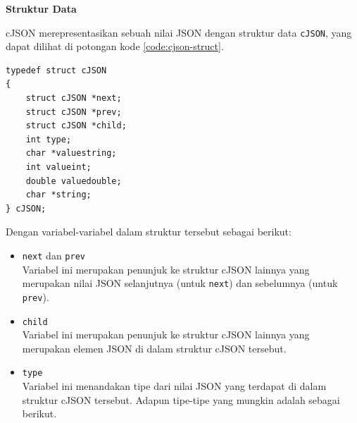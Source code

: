 \documentclass[a4paper,twoside]{article}
\begin{document}
\begin{enumerate}
\textbf{Struktur Data}
\label{sec:cmodules-cJSON-datastruct}

cJSON merepresentasikan sebuah nilai JSON dengan struktur data \verb|cJSON|, yang dapat dilihat di potongan kode \ref{code:cjson-struct}.

\begin{lstlisting}[caption=Struktur data cJSON, label=code:cjson-struct]
typedef struct cJSON
{
    struct cJSON *next;
    struct cJSON *prev;
    struct cJSON *child;
    int type;
    char *valuestring;
    int valueint;
    double valuedouble;
    char *string;
} cJSON;
\end{lstlisting}
\noindent
Dengan variabel-variabel dalam struktur tersebut sebagai berikut:

\begin{itemize}
	\item \verb|next| dan \verb|prev|\\
	Variabel ini merupakan penunjuk ke struktur cJSON lainnya yang merupakan nilai JSON selanjutnya (untuk \verb|next|) dan sebelumnya (untuk \verb|prev|).
	\item \verb|child|\\
	Variabel ini merupakan penunjuk ke struktur cJSON lainnya yang merupakan elemen JSON di dalam struktur cJSON tersebut.
	\item \verb|type|\\
	Variabel ini menandakan tipe dari nilai JSON yang terdapat di dalam struktur cJSON tersebut. Adapun tipe-tipe yang mungkin adalah sebagai berikut.
	

\end{itemize}
\end{enumerate}
\end{document}
